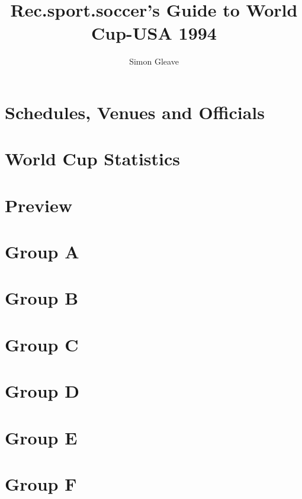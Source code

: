 \documentclass{memoir}
\begin{document}
\frontmatter
\setcounter{tocdepth}{0}
\tableofcontents
\title{Rec.sport.soccer’s Guide to World Cup-USA 1994}
\author{Simon Gleave}
\maketitle

\mainmatter
\part{Schedules, Venues and Officials}



\part{World Cup Statistics}




\part{Preview}

\part{Group A}





\part{Group B}





\part{Group C}





\part{Group D}





\part{Group E}





\part{Group F}





\end{document}

